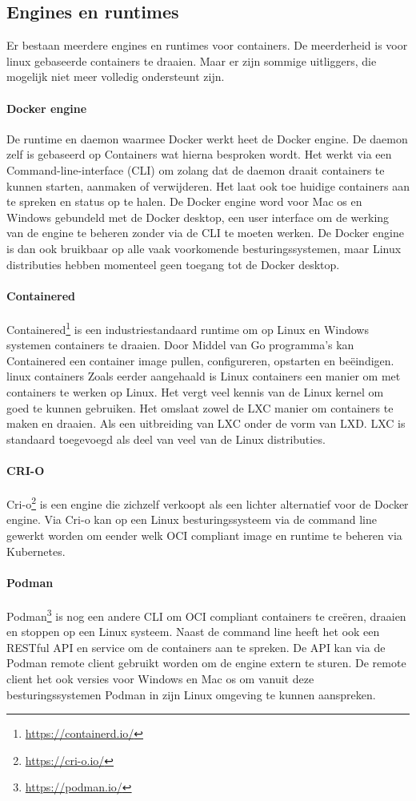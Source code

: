 \subsection{Engines en runtimes}
Er bestaan meerdere engines en runtimes voor containers. De meerderheid is voor linux gebaseerde containers te draaien. Maar er zijn sommige uitliggers, die mogelijk niet meer volledig ondersteunt zijn.

\paragraph{Docker engine}
De runtime en daemon waarmee Docker werkt heet de Docker engine. De daemon zelf is gebaseerd op Containers wat hierna besproken wordt. Het werkt via een Command-line-interface (CLI) om zolang dat de daemon draait containers te kunnen starten, aanmaken of verwijderen. Het laat ook toe huidige containers aan te spreken en status op te halen. De Docker engine word voor Mac os en Windows gebundeld met de Docker desktop, een user interface om de werking van de engine te beheren zonder via de CLI  te moeten werken. De Docker engine is dan ook bruikbaar op alle vaak voorkomende besturingssystemen, maar Linux distributies hebben momenteel geen toegang tot de Docker desktop.
\paragraph{Containered}
Containered\footnote{\url{https://containerd.io/}} is een industriestandaard runtime om op Linux en Windows systemen containers te draaien. Door Middel van Go programma’s kan Containered een container image pullen, configureren, opstarten en beëindigen.
linux containers
Zoals eerder aangehaald is Linux containers een manier om met containers te werken op Linux. Het vergt veel kennis van de Linux kernel om goed te kunnen gebruiken.  Het omslaat zowel de LXC manier om containers te maken en draaien. Als een uitbreiding van LXC onder de vorm van LXD. LXC is standaard toegevoegd als deel van veel van de Linux distributies.  
\paragraph{CRI-O}
Cri-o\footnote{\url{https://cri-o.io/}} is een engine die zichzelf verkoopt als een lichter alternatief voor de Docker engine.  Via Cri-o kan op een Linux besturingssysteem via de command line gewerkt worden om eender welk OCI compliant image en runtime te beheren via Kubernetes.
\paragraph{Podman}
Podman\footnote{\url{https://podman.io/}} is nog een andere CLI om OCI compliant containers te creëren, draaien en stoppen op een Linux systeem. Naast de command line heeft het ook een RESTful API en service om de containers aan te spreken. De API kan via de Podman remote client gebruikt worden om de engine extern te sturen. De remote client het ook versies voor Windows en Mac os om vanuit deze besturingssystemen Podman in zijn Linux omgeving te kunnen aanspreken.
